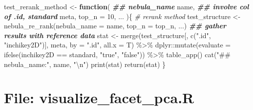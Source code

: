 \documentclass[
]{article}
\newenvironment{Shaded}{\begin{snugshade}}{\end{snugshade}}
\newcommand{\AttributeTok}[1]{\textcolor[rgb]{0.77,0.63,0.00}{#1}}
\newcommand{\CommentTok}[1]{\textcolor[rgb]{0.56,0.35,0.01}{\textit{#1}}}
\newcommand{\ControlFlowTok}[1]{\textcolor[rgb]{0.13,0.29,0.53}{\textbf{#1}}}
\newcommand{\DecValTok}[1]{\textcolor[rgb]{0.00,0.00,0.81}{#1}}
\newcommand{\DocumentationTok}[1]{\textcolor[rgb]{0.56,0.35,0.01}{\textbf{\textit{#1}}}}
\newcommand{\FunctionTok}[1]{\textcolor[rgb]{0.00,0.00,0.00}{#1}}
\newcommand{\NormalTok}[1]{#1}
\newcommand{\OtherTok}[1]{\textcolor[rgb]{0.56,0.35,0.01}{#1}}
\newcommand{\SpecialCharTok}[1]{\textcolor[rgb]{0.00,0.00,0.00}{#1}}
\newcommand{\StringTok}[1]{\textcolor[rgb]{0.31,0.60,0.02}{#1}}
\begin{document}
\begin{Shaded}
\begin{Highlighting}[]
\NormalTok{test\_rerank\_method }\OtherTok{\textless{}{-}} 
  \ControlFlowTok{function}\NormalTok{(}
           \DocumentationTok{\#\# nebula\_name}
\NormalTok{           name,}
           \DocumentationTok{\#\# involve col of .id, standard}
\NormalTok{           meta,}
           \AttributeTok{top\_n =} \DecValTok{10}\NormalTok{,}
\NormalTok{           ...}
\NormalTok{           )\{}
    \CommentTok{\# rerank method}
\NormalTok{    test\_structure }\OtherTok{\textless{}{-}} \FunctionTok{nebula\_re\_rank}\NormalTok{(}\AttributeTok{nebula\_name =}\NormalTok{ name, }\AttributeTok{top\_n =}\NormalTok{ top\_n, ...)}
    \DocumentationTok{\#\# gather results with reference data}
\NormalTok{    stat }\OtherTok{\textless{}{-}} \FunctionTok{merge}\NormalTok{(test\_structure[, }\FunctionTok{c}\NormalTok{(}\StringTok{".id"}\NormalTok{, }\StringTok{"inchikey2D"}\NormalTok{)], meta,}
                            \AttributeTok{by =} \StringTok{".id"}\NormalTok{, }\AttributeTok{all.x =}\NormalTok{ T) }\SpecialCharTok{\%\textgreater{}\%}
\NormalTok{      dplyr}\SpecialCharTok{::}\FunctionTok{mutate}\NormalTok{(}\AttributeTok{evaluate =} \FunctionTok{ifelse}\NormalTok{(inchikey2D }\SpecialCharTok{==}\NormalTok{ standard, }\StringTok{"true"}\NormalTok{, }\StringTok{"false"}\NormalTok{)) }\SpecialCharTok{\%\textgreater{}\%}
      \FunctionTok{table\_app}\NormalTok{()}
    \FunctionTok{cat}\NormalTok{(}\StringTok{"\#\# nebula\_name:"}\NormalTok{, name, }\StringTok{"}\SpecialCharTok{\textbackslash{}n}\StringTok{"}\NormalTok{)}
    \FunctionTok{print}\NormalTok{(stat)}
    \FunctionTok{return}\NormalTok{(stat)}
\NormalTok{  \}}
\end{Highlighting}
\end{Shaded}

\hypertarget{file-visualize_facet_pca.r}{%
\section{File: visualize\_facet\_pca.R}\label{file-visualize_facet_pca.r}}
\end{document}

